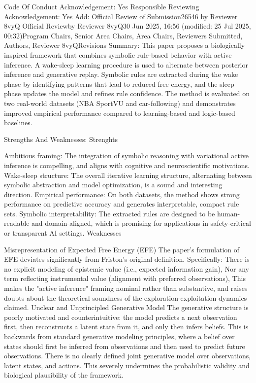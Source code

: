 Code Of Conduct Acknowledgement: Yes
Responsible Reviewing Acknowledgement: Yes
Add:
Official Review of Submission26546 by Reviewer 8vyQ
Official Reviewby Reviewer 8vyQ30 Jun 2025, 16:56 (modified: 25 Jul 2025, 00:32)Program Chairs, Senior Area Chairs, Area Chairs, Reviewers Submitted, Authors, Reviewer 8vyQRevisions
Summary:
This paper proposes a biologically inspired framework that combines symbolic rule-based behavior with active inference. A wake-sleep learning procedure is used to alternate between posterior inference and generative replay. Symbolic rules are extracted during the wake phase by identifying patterns that lead to reduced free energy, and the sleep phase updates the model and refines rule confidence. The method is evaluated on two real-world datasets (NBA SportVU and car-following) and demonstrates improved empirical performance compared to learning-based and logic-based baselines.

Strengths And Weaknesses:
Strenghts

Ambitious framing: The integration of symbolic reasoning with variational active inference is compelling, and aligns with cognitive and neuroscientific motivations.
Wake-sleep structure: The overall iterative learning structure, alternating between symbolic abstraction and model optimization, is a sound and interesting direction.
Empirical performance: On both datasets, the method shows strong performance on predictive accuracy and generates interpretable, compact rule sets.
Symbolic interpretability: The extracted rules are designed to be human-readable and domain-aligned, which is promising for applications in safety-critical or transparent AI settings.
Weaknesses

Misrepresentation of Expected Free Energy (EFE) The paper’s formulation of EFE deviates significantly from Friston’s original definition. Specifically:
There is no explicit modeling of epistemic value (i.e., expected information gain),
Nor any term reflecting instrumental value (alignment with preferred observations), This makes the "active inference" framing nominal rather than substantive, and raises doubts about the theoretical soundness of the exploration-exploitation dynamics claimed.
Unclear and Unprincipled Generative Model The generative structure is poorly motivated and counterintuitive: the model predicts a next observation first, then reconstructs a latent state from it, and only then infers beliefs. This is backwards from standard generative modeling principles, where a belief over states should first be inferred from observations and then used to predict future observations. There is no clearly defined joint generative model over observations, latent states, and actions. This severely undermines the probabilistic validity and biological plausibility of the framework.

